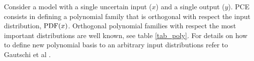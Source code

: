 \documentclass[preprint,12pt]{elsarticle}
\begin{document}
Consider a model with a single uncertain input ($x$) and a single output ($y$). PCE consists in defining a polynomial family that is orthogonal with respect the input distribution, $\mathrm{PDF}(x)$. Orthogonal polynomial families with respect the most important distributions are well known, see table \ref{tab_poly}. For details on how to define new polynomial basis to an arbitrary input distributions refer to Gautschi et al \cite{gautschi1994algorithm}.

\begin{table}[h!]
\begin{center}
\caption{Classical orthogonal polynomial families.}
\label{tab_poly}
\end{center}
\end{table}







\end{document}
